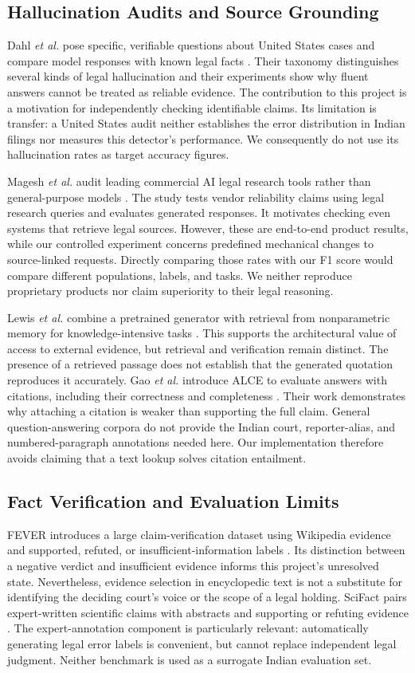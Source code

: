 \subsection{Hallucination Audits and Source Grounding}
Dahl \emph{et al.} pose specific, verifiable questions about United States cases and compare model responses with known legal facts \cite{ref1}. Their taxonomy distinguishes several kinds of legal hallucination and their experiments show why fluent answers cannot be treated as reliable evidence. The contribution to this project is a motivation for independently checking identifiable claims. Its limitation is transfer: a United States audit neither establishes the error distribution in Indian filings nor measures this detector's performance. We consequently do not use its hallucination rates as target accuracy figures.

Magesh \emph{et al.} audit leading commercial AI legal research tools rather than general-purpose models \cite{ref2}. The study tests vendor reliability claims using legal research queries and evaluates generated responses. It motivates checking even systems that retrieve legal sources. However, these are end-to-end product results, while our controlled experiment concerns predefined mechanical changes to source-linked requests. Directly comparing those rates with our F1 score would compare different populations, labels, and tasks. We neither reproduce proprietary products nor claim superiority to their legal reasoning.

Lewis \emph{et al.} combine a pretrained generator with retrieval from nonparametric memory for knowledge-intensive tasks \cite{ref3}. This supports the architectural value of access to external evidence, but retrieval and verification remain distinct. The presence of a retrieved passage does not establish that the generated quotation reproduces it accurately. Gao \emph{et al.} introduce ALCE to evaluate answers with citations, including their correctness and completeness \cite{ref4}. Their work demonstrates why attaching a citation is weaker than supporting the full claim. General question-answering corpora do not provide the Indian court, reporter-alias, and numbered-paragraph annotations needed here. Our implementation therefore avoids claiming that a text lookup solves citation entailment.

\subsection{Fact Verification and Evaluation Limits}
FEVER introduces a large claim-verification dataset using Wikipedia evidence and supported, refuted, or insufficient-information labels \cite{ref5}. Its distinction between a negative verdict and insufficient evidence informs this project's unresolved state. Nevertheless, evidence selection in encyclopedic text is not a substitute for identifying the deciding court's voice or the scope of a legal holding. SciFact pairs expert-written scientific claims with abstracts and supporting or refuting evidence \cite{ref6}. The expert-annotation component is particularly relevant: automatically generating legal error labels is convenient, but cannot replace independent legal judgment. Neither benchmark is used as a surrogate Indian evaluation set.

